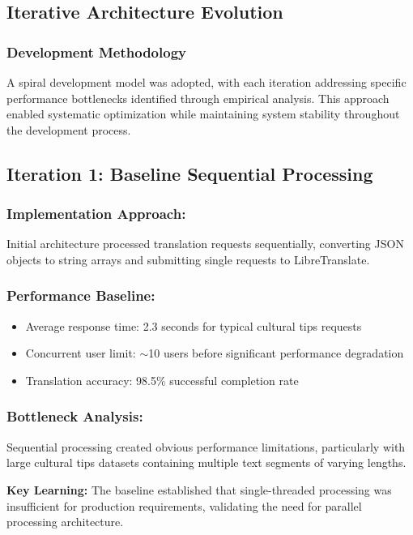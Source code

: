 \subsection{Iterative Architecture Evolution}

\subsubsection{Development Methodology}

A spiral development model was adopted, with each iteration addressing specific performance bottlenecks identified through empirical analysis. This approach enabled systematic optimization while maintaining system stability throughout the development process.

\subsection{Iteration 1: Baseline Sequential Processing}

\subsubsection{Implementation Approach:} Initial architecture processed translation requests sequentially, converting JSON objects to string arrays and submitting single requests to LibreTranslate.

\subsubsection{Performance Baseline:}
\begin{itemize}
    \item Average response time: 2.3 seconds for typical cultural tips requests
    \item Concurrent user limit: $\sim$10 users before significant performance degradation
    \item Translation accuracy: 98.5\% successful completion rate
\end{itemize}

\subsubsection{Bottleneck Analysis:} Sequential processing created obvious performance limitations, particularly with large cultural tips datasets containing multiple text segments of varying lengths.

\textbf{Key Learning:} The baseline established that single-threaded processing was insufficient for production requirements, validating the need for parallel processing architecture.

